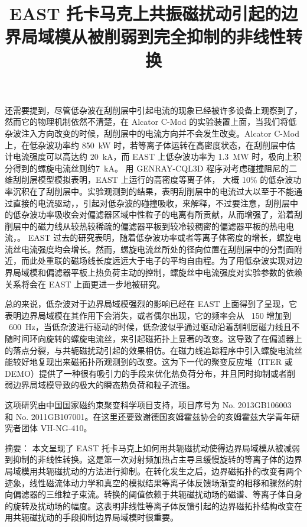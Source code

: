 还需要提到，尽管低杂波在刮削层中引起电流的现象已经被许多设备上观察到了，然而它的物理机制依然不清楚，在 Alcator C-Mod 的实验装置上面，当我们将低杂波注入方向改变的时候，刮削层中的电流方向并不会发生改变。Alcator C-Mod 上，在低杂波功率约 \SI{850}{\kilo\watt} 时，若等离子体运转在高密度状态，在刮削层中估计电流强度可以高达约 \SI{20}{\kilo\ampere}，而 EAST 上低杂波功率为 \SI{1.3}{\mega\watt} 时，极向上积分得到的螺旋电流丝则约\SI{7}{\kilo\ampere}。
用 GENRAY-CQL3D 程序对考虑碰撞阻尼的二维刮削层模型模拟表明，EAST 上运行的高密度等离子体， 大概 10\% 的低杂波功率沉积在了刮削层中。实验观测到的结果，表明刮削层中的电流过大以至于不能通过直接的电流驱动，，引起对低杂波的碰撞吸收，来解释，不过要注意，刮削层中的低杂波功率吸收会对偏滤器区域中性粒子的电离有所贡献，从而增强了，沿着刮削层中的磁力线从较热较稀疏的偏滤器平板到较冷较稠密的偏滤器平板的热电电流，。
EAST 过去的研究表明，随着低杂波功率或者等离子体密度的增长，螺旋电流丝电流强度均会增长。然而，螺旋电流丝所处的径向位置在刮削层中的分割面附近，而此处重联的磁场线长度远远大于电子的平均自由程。为了用低杂波实现对边界局域模和偏滤器平板上热负荷主动的控制，螺旋丝中电流强度对实验参数的依赖关系将会在 EAST 上面更进一步地被研究。

总的来说，低杂波对于边界局域模强烈的影响已经在 EAST 上面得到了呈现，它表明边界局域模在其作用下会消失，或者偶尔出现，它的频率会从 ~150 增加到 ~\SI{600}{\hertz}，当低杂波进行驱动的时候，低杂波似乎通过驱动沿着刮削层磁力线且不随时间环向旋转的螺旋电流丝，来引起磁拓扑上显著的改变。这导致了在偏滤器上的落点分裂，与共轭磁扰动引起的效果相仿。在磁力线追踪程序中引入螺旋电流丝能较好地复现出来磁拓扑所观测到的改变。这为下一代的聚变反应堆（ITER 或 DEMO）提供了一种很有吸引力的手段来优化热负荷分布，并且同时抑制或者削弱边界局域模导致的极大的瞬态热负荷和粒子流强。

这项研究由中国国家磁约束聚变科学项目支持，项目序号为 No. 2013GB106003 和 No. 2011GB107001。在这里还要致谢德国亥姆霍兹协会的亥姆霍兹大学青年研究者团体  VH-NG-410。



\title{EAST 托卡马克上共振磁扰动引起的边界局域模从被削弱到完全抑制的非线性转换}

{\heiti 摘要：} 本文呈现了 EAST 托卡马克上如何用共轭磁扰动使得边界局域模从被减弱到抑制的非线性转换。这是第一次对射频加热占主导且缓慢旋转的等离子体的边界局域模用共轭磁扰动的方法进行抑制。在转化发生之后，边界磁拓扑的改变有两个迹象，线性磁流体动力学和真空的模拟结果等离子体反馈场渐变的相移和骤然的射向偏滤器的三维粒子束流。转换的阈值依赖于共轭磁扰动场的磁谱、等离子体自身的旋转及扰动场的幅度。这表明非线性等离子体反馈引起的边界磁拓扑结构改变在用共轭磁扰动的手段抑制边界局域模时很重要。


